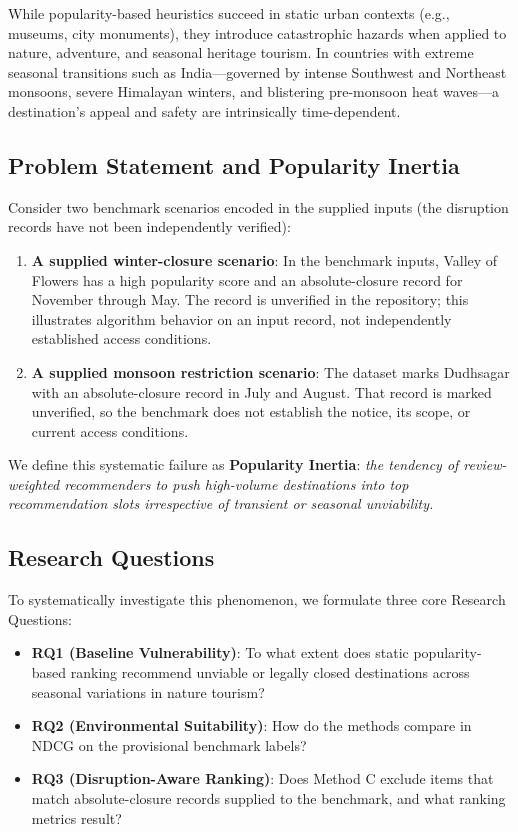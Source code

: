\documentclass[conference]{IEEEtran}
\begin{document}
While popularity-based heuristics succeed in static urban contexts (e.g., museums, city monuments), they introduce catastrophic hazards when applied to nature, adventure, and seasonal heritage tourism. In countries with extreme seasonal transitions such as India---governed by intense Southwest and Northeast monsoons, severe Himalayan winters, and blistering pre-monsoon heat waves---a destination's appeal and safety are intrinsically time-dependent. 

\subsection{Problem Statement and Popularity Inertia}
Consider two benchmark scenarios encoded in the supplied inputs (the disruption records have not been independently verified):
\begin{enumerate}
    \item \textbf{A supplied winter-closure scenario}: In the benchmark inputs, Valley of Flowers has a high popularity score and an absolute-closure record for November through May. The record is unverified in the repository; this illustrates algorithm behavior on an input record, not independently established access conditions.
    \item \textbf{A supplied monsoon restriction scenario}: The dataset marks Dudhsagar with an absolute-closure record in July and August. That record is marked unverified, so the benchmark does not establish the notice, its scope, or current access conditions.
\end{enumerate}

We define this systematic failure as \textbf{Popularity Inertia}: \textit{the tendency of review-weighted recommenders to push high-volume destinations into top recommendation slots irrespective of transient or seasonal unviability.}

\subsection{Research Questions}
To systematically investigate this phenomenon, we formulate three core Research Questions:
\begin{itemize}
    \item \textbf{RQ1 (Baseline Vulnerability)}: To what extent does static popularity-based ranking recommend unviable or legally closed destinations across seasonal variations in nature tourism?
    \item \textbf{RQ2 (Environmental Suitability)}: How do the methods compare in NDCG on the provisional benchmark labels?
    \item \textbf{RQ3 (Disruption-Aware Ranking)}: Does Method C exclude items that match absolute-closure records supplied to the benchmark, and what ranking metrics result?
\end{itemize}
\end{document}

